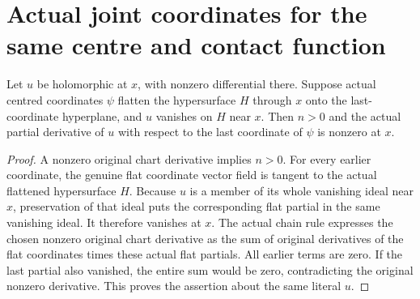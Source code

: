 \section{Actual joint coordinates for the same centre and contact function}
\label{sec:hironaka-actual-centre-contact-coordinates}

\begin{theorem}
\label{hir:actual-centre-contact-last-normal-partial}
\leanok
Let $u$ be holomorphic at $x$, with nonzero differential there. Suppose actual centred coordinates $\psi$ flatten the hypersurface $H$ through $x$ onto the last-coordinate hyperplane, and $u$ vanishes on $H$ near $x$. Then $n>0$ and the actual partial derivative of $u$ with respect to the last coordinate of $\psi$ is nonzero at $x$.
\end{theorem}
\begin{proof}
A nonzero original chart derivative implies $n>0$. For every earlier coordinate, the genuine flat coordinate vector field is tangent to the actual flattened hypersurface $H$. Because $u$ is a member of its whole vanishing ideal near $x$, preservation of that ideal puts the corresponding flat partial in the same vanishing ideal. It therefore vanishes at $x$. The actual chain rule expresses the chosen nonzero original chart derivative as the sum of original derivatives of the flat coordinates times these actual flat partials. All earlier terms are zero. If the last partial also vanished, the entire sum would be zero, contradicting the original nonzero derivative. This proves the assertion about the same literal $u$.
\end{proof}


